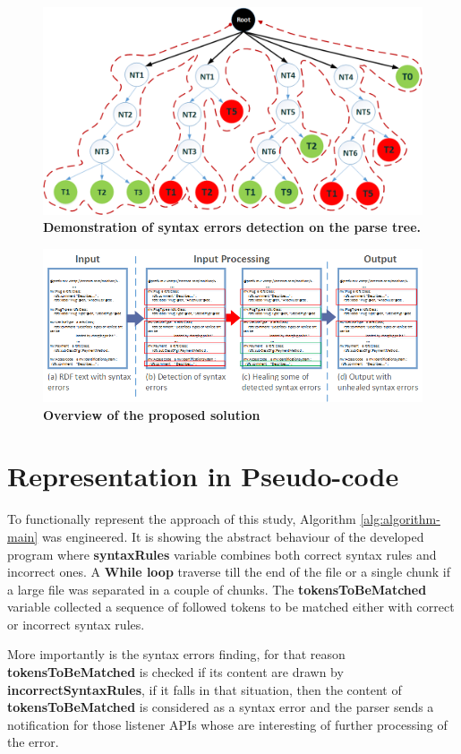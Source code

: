 \begin{figure}
	\centering
	  	\includegraphics[width=.8\textwidth]{images/approachParseTree.png}
		\caption{\textbf{Demonstration of syntax errors detection on the parse tree.}}
		\label{Fig:approachParseTree}  
\end{figure}

\begin{figure}
	\centering
	  	\includegraphics[width=1\textwidth]{images/Approach.png}
		\caption{\textbf{Overview of the proposed solution}}
		\label{Fig:Approach}  
\end{figure}
\section{Representation in Pseudo-code}
To functionally represent the approach of this study, Algorithm \ref{alg:algorithm-main} was engineered. It is showing the abstract behaviour of the developed program where \textbf{syntaxRules} variable combines both correct syntax rules and incorrect ones. A \textbf{While loop} traverse till the end of the file or a single chunk if a large file was separated in a couple of chunks. The \textbf{tokensToBeMatched}  variable collected a sequence of followed tokens to be matched either with correct or incorrect syntax rules.

More importantly is the syntax errors finding, for that reason \textbf{tokensToBeMatched} is checked if its content are drawn by \textbf{incorrectSyntaxRules}, if it falls in that situation, then the content of \textbf{tokensToBeMatched} is considered as a syntax error and the parser sends a notification for those listener APIs  whose are interesting of further processing of the error. 

